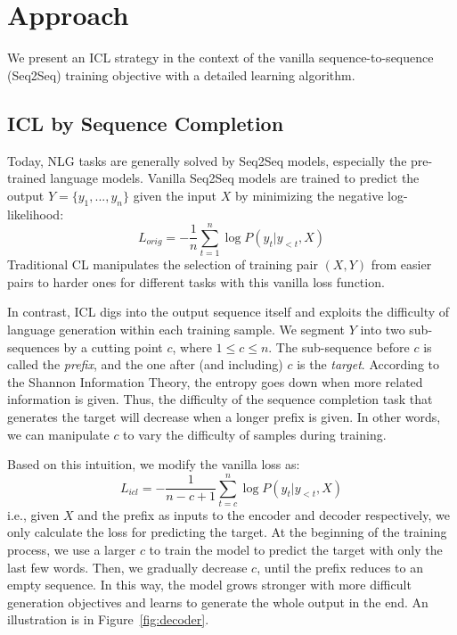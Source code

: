 \section{Approach}
\label{sec:approach}
We present an ICL strategy in the context of the vanilla sequence-to-sequence (Seq2Seq) 
training objective with a detailed learning algorithm.

\subsection{ICL by Sequence Completion}
\label{sec:icl}

Today, NLG tasks are generally solved by Seq2Seq models, especially the pre-trained language models. 
Vanilla Seq2Seq models are trained to predict the output $Y=\{ y_1, ..., y_n\}$ 
given the input $X$ by minimizing the negative log-likelihood:
\begin{equation}
L_{orig} = -\frac{1}{n}\sum_{t=1}^{n}\log P(y_t|y_{<t}, X)
\end{equation}
Traditional CL manipulates the selection of training pair $(X, Y)$ from easier pairs to harder ones for different tasks with this vanilla loss function.

In contrast, ICL digs into the output sequence itself and exploits the difficulty of 
language generation within each training sample.
We segment $Y$ into two sub-sequences by a cutting point $c$, where $1\leq c\leq n$. The sub-sequence 
before $c$ is called the \textit{prefix}, and the one after (and including) $c$ is the \textit{target}. 
According to the Shannon Information Theory, the entropy goes down when more related information is given.
Thus, the difficulty of the sequence completion task that generates the target will decrease when a longer prefix is given. In other words, we can manipulate $c$ to vary the difficulty of samples during 
training.

Based on this intuition, we modify the vanilla loss as:
\begin{equation}
	L_{icl} = -\frac{1}{n-c+1}\sum_{t=c}^{n}\log P(y_t|y_{<t}, X)
	\label{eq:icl}
\end{equation}
i.e., given $X$ and the prefix as inputs to the encoder and decoder respectively, we only calculate the loss for predicting the target.
At the beginning of the training process, we use a larger $c$ to train the model to predict 
the target with only the last few words.
Then, we gradually decrease $c$, until the prefix reduces to an empty sequence.
In this way, the model grows stronger with more difficult generation objectives and 
learns to generate the whole output in the end. An illustration is in Figure~\ref{fig:decoder}.
 
